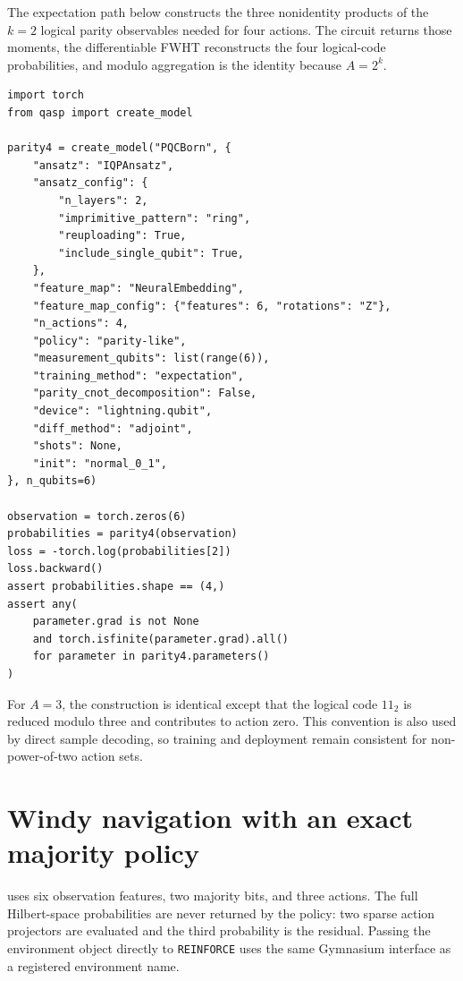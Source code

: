\documentclass[10pt]{article}
\newcommand{\code}[1]{\texttt{#1}}
\begin{document}
The expectation path below constructs the three nonidentity products of the
$k=2$ logical parity observables needed for four actions.  The circuit returns
those moments, the differentiable FWHT reconstructs the four logical-code
probabilities, and modulo aggregation is the identity because $A=2^k$.

\begin{lstlisting}[caption={Four-action recursive parity using exact logical moments rather than a $2^6$ probability vector.},label={lst:multiaction-parity}]
import torch
from qasp import create_model

parity4 = create_model("PQCBorn", {
    "ansatz": "IQPAnsatz",
    "ansatz_config": {
        "n_layers": 2,
        "imprimitive_pattern": "ring",
        "reuploading": True,
        "include_single_qubit": True,
    },
    "feature_map": "NeuralEmbedding",
    "feature_map_config": {"features": 6, "rotations": "Z"},
    "n_actions": 4,
    "policy": "parity-like",
    "measurement_qubits": list(range(6)),
    "training_method": "expectation",
    "parity_cnot_decomposition": False,
    "device": "lightning.qubit",
    "diff_method": "adjoint",
    "shots": None,
    "init": "normal_0_1",
}, n_qubits=6)

observation = torch.zeros(6)
probabilities = parity4(observation)
loss = -torch.log(probabilities[2])
loss.backward()
assert probabilities.shape == (4,)
assert any(
    parameter.grad is not None
    and torch.isfinite(parameter.grad).all()
    for parameter in parity4.parameters()
)
\end{lstlisting}

For $A=3$, the construction is identical except that the logical code $11_2$
is reduced modulo three and contributes to action zero.  This convention is
also used by direct sample decoding, so training and deployment remain
consistent for non-power-of-two action sets.

\section{Windy navigation with an exact majority policy}
\label{app:windy-example}

 uses six observation features, two majority bits, and
three actions.  The full Hilbert-space probabilities are never returned by the
policy: two sparse action projectors are evaluated and the third probability
is the residual.  Passing the environment object directly to \code{REINFORCE}
uses the same Gymnasium interface as a registered environment name.
\end{document}
